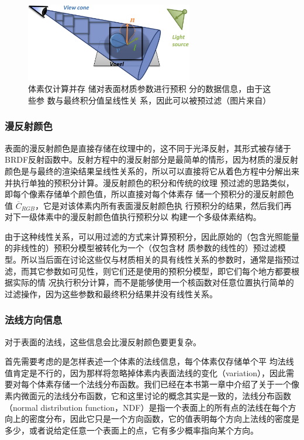 \begin{figure}
\sidecaption
	\includegraphics[width=0.65\textwidth]{figures/vct/vct-9-1}
	\caption{体素仅计算并存 储对表面材质参数进行预积 分的数据信息，由于这些参 数与最终积分值呈线性关 系，因此可以被预过滤（图片来自\cite{a:InteractiveIndirectIlluminationUsingVoxelConeTracing}）}
	\label{f:vct-9-1}
\end{figure}



\subsubsection{漫反射颜色}
表面的漫反射颜色是直接存储在纹理中的，这不同于光泽反射，其形式被存储于BRDF反射函数中。反射方程中的漫反射部分是最简单的情形，因为材质的漫反射颜色是与最终的渲染结果呈线性关系的，所以可以直接将它从着色方程中分解出来并执行单独的预积分计算。漫反射颜色的积分和传统的纹理 预过滤的思路类似，即每个像素存储单个颜色值，所以直接对每个体素存 储一个预积分的漫反射颜色值 $\overline{C}_{RGB}$，它是对该体素内所有表面漫反射颜色执 行预积分的结果，然后我们再对下一级体素中的漫反射颜色值执行预积分以 构建一个多级体素结构。

由于这种线性关系，可以用过滤的方式来计算预积分，因此原始的（包含光照能量的非线性的）预积分模型被转化为一个（仅包含材 质参数的线性的）预过滤模型。所以当后面在讨论这些仅与材质相关的具有线性关系的参数时，通常是指预过滤，而其它参数如可见性，则它们还是使用的预积分模型，即它们每个地方都要根据实际的情 况执行积分计算，而不是能够使用一个核函数对任意位置执行简单的过滤操作，因为这些参数和最终积分结果并没有线性关系。



\subsubsection{法线方向信息}
对于表面的法线，这些信息会比漫反射颜色要更复杂。

首先需要考虑的是怎样表述一个体素的法线信息，每个体素仅存储单个平 均法线值肯定是不行的，因为那样将忽略掉体素内表面法线的变化（variation），因此需要对每个体素存储一个法线分布函数。我们已经在本书第一章中介绍了关于一个像素内微面元的法线分布函数，它和这里讨论的概念其实是一致的，法线分布函数（normal distribution function，NDF）是指一个表面上的所有点的法线在每个方向上的密度分布，因此它只是一个方向函数，它的值表明每个方向上法线的密度是多少，或者说给定任意一个表面上的点，它有多少概率指向某个方向。

